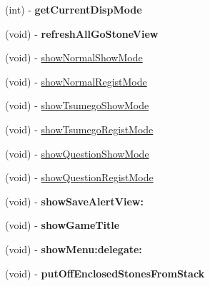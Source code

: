 \begin{DoxyCompactItemize}
\item 
\hypertarget{interface_abstract_record_view_controller_a65bf13a50920e352d60dd6b8985fab9b}{
(int) -\/ {\bfseries getCurrentDispMode}}
\label{interface_abstract_record_view_controller_a65bf13a50920e352d60dd6b8985fab9b}

\item 
\hypertarget{interface_abstract_record_view_controller_a40384d4a2a0528073f206b2f345532e0}{
(void) -\/ {\bfseries refreshAllGoStoneView}}
\label{interface_abstract_record_view_controller_a40384d4a2a0528073f206b2f345532e0}

\item 
(void) -\/ \hyperlink{interface_abstract_record_view_controller_a27a4c02c17337cece7bc250de2449f96}{showNormalShowMode}
\item 
(void) -\/ \hyperlink{interface_abstract_record_view_controller_a5709ef9f7c65e524822ec7765f8c4c4b}{showNormalRegistMode}
\item 
(void) -\/ \hyperlink{interface_abstract_record_view_controller_ae0a771f6cbfe223a0b3d72fab37e12a8}{showTsumegoShowMode}
\item 
(void) -\/ \hyperlink{interface_abstract_record_view_controller_a3af87d17d486ae3ac03adb8c6bf76c14}{showTsumegoRegistMode}
\item 
(void) -\/ \hyperlink{interface_abstract_record_view_controller_a55f6add41b02e10e1e89a6fca71c18a5}{showQuestionShowMode}
\item 
(void) -\/ \hyperlink{interface_abstract_record_view_controller_a6405ef4502d057e9778a265fa63230f4}{showQuestionRegistMode}
\item 
\hypertarget{interface_abstract_record_view_controller_a36ee966347c83a924feccd85aa6b2826}{
(void) -\/ {\bfseries showSaveAlertView:}}
\label{interface_abstract_record_view_controller_a36ee966347c83a924feccd85aa6b2826}

\item 
\hypertarget{interface_abstract_record_view_controller_abf6f1c4329169c26f22e85091b790f3c}{
(void) -\/ {\bfseries showGameTitle}}
\label{interface_abstract_record_view_controller_abf6f1c4329169c26f22e85091b790f3c}

\item 
\hypertarget{interface_abstract_record_view_controller_a1a4c889e86c8c7bbb2ec7292b4c1d851}{
(void) -\/ {\bfseries showMenu:delegate:}}
\label{interface_abstract_record_view_controller_a1a4c889e86c8c7bbb2ec7292b4c1d851}

\item 
\hypertarget{interface_abstract_record_view_controller_acfef3c389bc87c5501223a0340bb5d42}{
(void) -\/ {\bfseries putOffEnclosedStonesFromStack}}
\label{interface_abstract_record_view_controller_acfef3c389bc87c5501223a0340bb5d42}


\end{DoxyCompactItemize}

